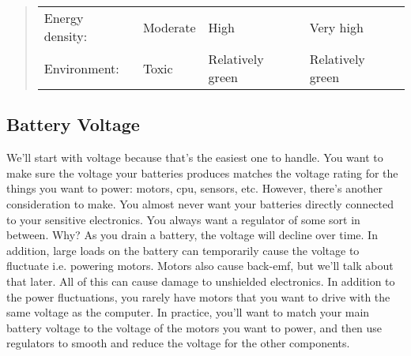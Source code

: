 \begin{quote}
\begin{longtable}[]{@{}llll@{}}
\begin{minipage}[t]{0.22\columnwidth}\raggedright
Energy density:\strut
\end{minipage} & \begin{minipage}[t]{0.15\columnwidth}\raggedright
Moderate\strut
\end{minipage} & \begin{minipage}[t]{0.23\columnwidth}\raggedright
High\strut
\end{minipage} & \begin{minipage}[t]{0.23\columnwidth}\raggedright
Very high\strut
\end{minipage}\tabularnewline
\begin{minipage}[t]{0.22\columnwidth}\raggedright
Environment:\strut
\end{minipage} & \begin{minipage}[t]{0.15\columnwidth}\raggedright
Toxic\strut
\end{minipage} & \begin{minipage}[t]{0.23\columnwidth}\raggedright
Relatively green\strut
\end{minipage} & \begin{minipage}[t]{0.23\columnwidth}\raggedright
Relatively green\strut
\end{minipage}\tabularnewline
\bottomrule
\end{longtable}
\end{quote}

\hypertarget{battery-voltage}{%
\subsection{Battery Voltage}\label{battery-voltage}}

We'll start with voltage because that's the easiest one to handle. You
want to make sure the voltage your batteries produces matches the
voltage rating for the things you want to power: motors, cpu, sensors,
etc. However, there's another consideration to make. You almost never
want your batteries directly connected to your sensitive electronics.
You always want a regulator of some sort in between. Why? As you drain a
battery, the voltage will decline over time. In addition, large loads on
the battery can temporarily cause the voltage to fluctuate i.e. powering
motors. Motors also cause back-emf, but we'll talk about that later. All
of this can cause damage to unshielded electronics. In addition to the
power fluctuations, you rarely have motors that you want to drive with
the same voltage as the computer. In practice, you'll want to match your
main battery voltage to the voltage of the motors you want to power, and
then use regulators to smooth and reduce the voltage for the other
components.

